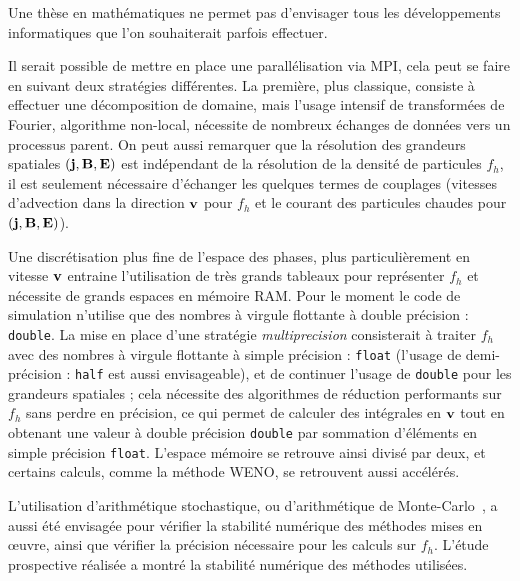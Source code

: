 
Une thèse en mathématiques ne permet pas d'envisager tous les développements informatiques que l'on souhaiterait parfois effectuer.

Il serait possible de mettre en place une parallélisation via MPI, cela peut se faire en suivant deux stratégies différentes. La première, plus classique, consiste à effectuer une décomposition de domaine, mais l'usage intensif de transformées de Fourier, algorithme non-local, nécessite de nombreux échanges de données vers un processus parent. On peut aussi remarquer que la résolution des grandeurs spatiales $(\vb{j},\vb{B},\vb{E})$ est indépendant de la résolution de la densité de particules $f_h$, il est seulement nécessaire d'échanger les quelques termes de couplages (vitesses d'advection dans la direction $\vb{v}$ pour $f_h$ et le courant des particules chaudes pour $(\vb{j},\vb{B},\vb{E})$).

Une discrétisation plus fine de l'espace des phases, plus particulièrement en vitesse $\vb{v}$ entraine l'utilisation de très grands tableaux pour représenter $f_h$ et nécessite de grands espaces en mémoire RAM. Pour le moment le code de simulation n'utilise que des nombres à virgule flottante à double précision : \texttt{double}. La mise en place d'une stratégie \emph{multiprecision} consisterait à traiter $f_h$ avec des nombres à virgule flottante à simple précision : \texttt{float} (l'usage de demi-précision : \texttt{half} est aussi envisageable), et de continuer l'usage de \texttt{double} pour les grandeurs spatiales ; cela nécessite des algorithmes de réduction performants sur $f_h$ sans perdre en précision, ce qui permet de calculer des intégrales en $\vb{v}$ tout en obtenant une valeur à double précision \texttt{double} par sommation d'éléments en simple précision \texttt{float}. L'espace mémoire se retrouve ainsi divisé par deux, et certains calculs, comme la méthode WENO, se retrouvent aussi accélérés.

L'utilisation d'arithmétique stochastique, ou d'arithmétique de Monte-Carlo~\cite{Parker:1997,Parker:1997a}, a aussi été envisagée pour vérifier la stabilité numérique des méthodes mises en œuvre, ainsi que vérifier la précision nécessaire pour les calculs sur $f_h$. L'étude prospective réalisée a montré la stabilité numérique des méthodes utilisées.
